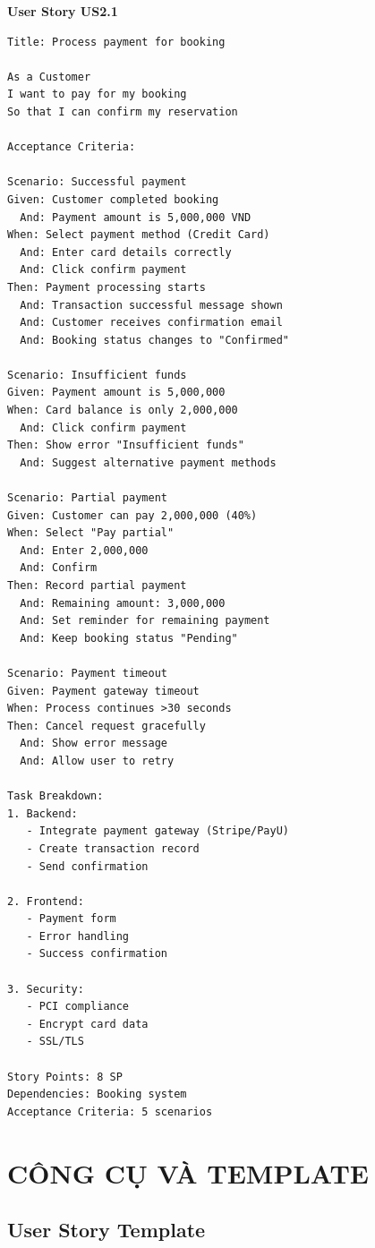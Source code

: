 \documentclass[12pt, a4paper]{report}
\begin{document}
\begin{tcolorbox}[colback=magenta!5, colframe=magenta!50]
\textbf{User Story US2.1}
\begin{lstlisting}
Title: Process payment for booking

As a Customer
I want to pay for my booking
So that I can confirm my reservation

Acceptance Criteria:

Scenario: Successful payment
Given: Customer completed booking
  And: Payment amount is 5,000,000 VND
When: Select payment method (Credit Card)
  And: Enter card details correctly
  And: Click confirm payment
Then: Payment processing starts
  And: Transaction successful message shown
  And: Customer receives confirmation email
  And: Booking status changes to "Confirmed"

Scenario: Insufficient funds
Given: Payment amount is 5,000,000
When: Card balance is only 2,000,000
  And: Click confirm payment
Then: Show error "Insufficient funds"
  And: Suggest alternative payment methods

Scenario: Partial payment
Given: Customer can pay 2,000,000 (40%)
When: Select "Pay partial"
  And: Enter 2,000,000
  And: Confirm
Then: Record partial payment
  And: Remaining amount: 3,000,000
  And: Set reminder for remaining payment
  And: Keep booking status "Pending"

Scenario: Payment timeout
Given: Payment gateway timeout
When: Process continues >30 seconds
Then: Cancel request gracefully
  And: Show error message
  And: Allow user to retry

Task Breakdown:
1. Backend:
   - Integrate payment gateway (Stripe/PayU)
   - Create transaction record
   - Send confirmation
   
2. Frontend:
   - Payment form
   - Error handling
   - Success confirmation
   
3. Security:
   - PCI compliance
   - Encrypt card data
   - SSL/TLS

Story Points: 8 SP
Dependencies: Booking system
Acceptance Criteria: 5 scenarios
\end{lstlisting}
\end{tcolorbox}

\newpage

\chapter{CÔNG CỤ VÀ TEMPLATE}

\section{User Story Template}
\end{document}
